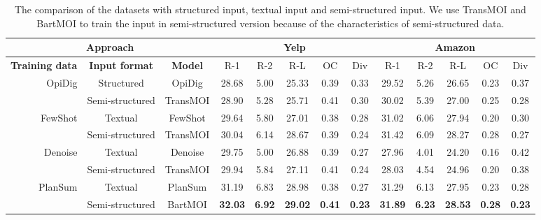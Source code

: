 \begin{table}[th]
	\begin{center}
		\small
		\begin{tabular}{|r|c|c|c|c|c|c|c|c|c|c|c|c|}
			\hline
			\multicolumn{3}{|c|}{\bf Approach} & \multicolumn{5}{c|}{\bf Yelp} &  \multicolumn{5}{c|}{\bf Amazon} \\
			\hline
			\textbf{Training data} & \textbf{Input format} & \textbf{Model} & R-1 & R-2 & R-L & OC & Div & R-1 & R-2 & R-L & OC & Div \\
			\hline
			\multirow{2}{*}{OpiDig} & Structured &OpiDig & 28.68 &5.00 & 25.33& 0.39 & 0.33 & 29.52 & 5.26 & 26.65 & 0.23 & 0.37 \\
			&Semi-structured& TransMOI & 28.90 & 5.28 & 25.71 & 0.41 & 0.30 &30.02 & 5.39& 27.00 & 0.25 & 0.28\\
			\hline
			\multirow{2}{*}{FewShot}  & Textual & FewShot & 29.64 & 5.80 & 27.01 & 0.38 & 0.28 & 31.02 & 6.06 & 27.94 & 0.20 & 0.30 \\
			& Semi-structured & TransMOI & 30.04 & 6.14 & 28.67 & 0.39 & 0.24 &31.42 & 6.09& 28.27 & 0.28 & 0.27\\
			\hline
			\multirow{2}{*}{Denoise} & Textual & Denoise& 29.75 & 5.00 & 26.88 & 0.39 & 0.27 &27.96 & 4.01 & 24.20& 0.16 & 0.42  \\
			& Semi-structured & TransMOI & 29.94 & 5.84& 27.11 & 0.41 & 0.24 & 28.03& 4.54& 24.96 & 0.20 & 0.38 \\
			\hline
			\multirow{2}{*}{PlanSum}  & Textual & PlanSum & 31.19&6.83 &28.98 &0.38 & 0.27 & 31.29 &6.13 & 27.95 & 0.23 & 0.28\\  %
			& Semi-structured & BartMOI & \bf 32.03& \bf 6.92 & \bf 29.02 & \bf 0.41 & \bf 0.23 & \bf 31.89 & \bf 6.23 &  \bf 28.53& \bf 0.28 & \bf 0.23 \\
			\hline
		\end{tabular}
	\end{center}
	\caption{The comparison of the datasets with structured input, textual input and semi-structured input. We use TransMOI and BartMOI to train the input in semi-structured version because of the characteristics of semi-structured data.}
	\label{tab:traindata}  
\end{table}

